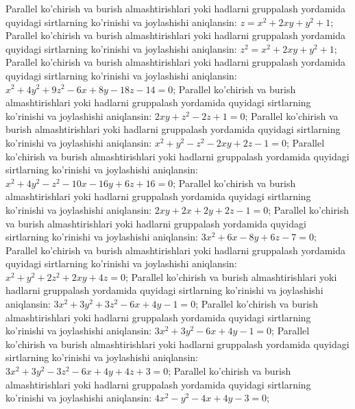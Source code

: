 Parallel ko'chirish va burish almashtirishlari yoki hadlarni gruppalash yordamida quyidagi sirtlarning ko'rinishi va joylashishi aniqlansin: $z=x^2+2 x y+y^2+1$;
Parallel ko'chirish va burish almashtirishlari yoki hadlarni gruppalash yordamida quyidagi sirtlarning ko'rinishi va joylashishi aniqlansin: $z^2=x^2+2 x y+y^2+1$;
Parallel ko'chirish va burish almashtirishlari yoki hadlarni gruppalash yordamida quyidagi sirtlarning ko'rinishi va joylashishi aniqlansin: $x^2+4 y^2+9 z^2-6 x+8 y-18 z-14=0$;
Parallel ko'chirish va burish almashtirishlari yoki hadlarni gruppalash yordamida quyidagi sirtlarning ko'rinishi va joylashishi aniqlansin: $2 x y+z^2-2 z+1=0$;
Parallel ko'chirish va burish almashtirishlari yoki hadlarni gruppalash yordamida quyidagi sirtlarning ko'rinishi va joylashishi aniqlansin: $x^2+y^2-z^2-2 x y+2 z-1=0$;
Parallel ko'chirish va burish almashtirishlari yoki hadlarni gruppalash yordamida quyidagi sirtlarning ko'rinishi va joylashishi aniqlansin: $x^2+4 y^2-z^2-10 x-16 y+6 z+16=0$;
Parallel ko'chirish va burish almashtirishlari yoki hadlarni gruppalash yordamida quyidagi sirtlarning ko'rinishi va joylashishi aniqlansin: $2 x y+2 x+2 y+2 z-1=0$;
Parallel ko'chirish va burish almashtirishlari yoki hadlarni gruppalash yordamida quyidagi sirtlarning ko'rinishi va joylashishi aniqlansin: $3 x^2+6 x-8 y+6 z-7=0$;
Parallel ko'chirish va burish almashtirishlari yoki hadlarni gruppalash yordamida quyidagi sirtlarning ko'rinishi va joylashishi aniqlansin: $x^2+y^2+2 z^2+2 x y+4 z=0$;
Parallel ko'chirish va burish almashtirishlari yoki hadlarni gruppalash yordamida quyidagi sirtlarning ko'rinishi va joylashishi aniqlansin: $3 x^2+3 y^2+3 z^2-6 x+4 y-1=0$;
Parallel ko'chirish va burish almashtirishlari yoki hadlarni gruppalash yordamida quyidagi sirtlarning ko'rinishi va joylashishi aniqlansin: $3 x^2+3 y^2-6 x+4 y-1=0$;
Parallel ko'chirish va burish almashtirishlari yoki hadlarni gruppalash yordamida quyidagi sirtlarning ko'rinishi va joylashishi aniqlansin: $3 x^2+3 y^2-3 z^2-6 x+4 y+4 z+3=0$;
Parallel ko'chirish va burish almashtirishlari yoki hadlarni gruppalash yordamida quyidagi sirtlarning ko'rinishi va joylashishi aniqlansin: $4 x^2-y^2-4 x+4 y-3=0$;
